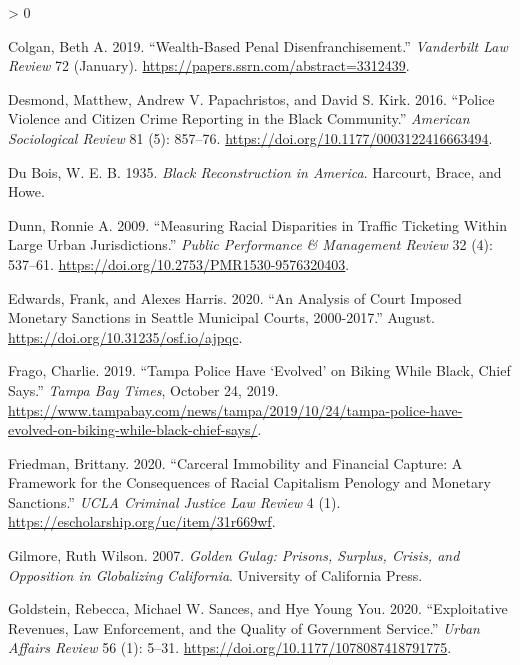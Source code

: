 \documentclass[
  12pt,
]{article}
\newlength{\cslhangindent}
\newenvironment{CSLReferences}[2] %
 {%
  \setlength{\parindent}{0pt}
  \ifodd #1 \everypar{\setlength{\hangindent}{\cslhangindent}}\ignorespaces\fi
  \ifnum #2 > 0
  \setlength{\parskip}{#2\baselineskip}
  \fi
 }%
 {}
\begin{document}
\begin{CSLReferences}{1}{0}
\leavevmode\hypertarget{ref-Colgan2019}{}%
Colgan, Beth A. 2019. {``Wealth-{Based Penal Disenfranchisement}.''} \emph{Vanderbilt Law Review} 72 (January). \url{https://papers.ssrn.com/abstract=3312439}.

\leavevmode\hypertarget{ref-Desmond2016}{}%
Desmond, Matthew, Andrew V. Papachristos, and David S. Kirk. 2016. {``Police {Violence} and {Citizen Crime Reporting} in the {Black Community}.''} \emph{American Sociological Review} 81 (5): 857--76. \url{https://doi.org/10.1177/0003122416663494}.

\leavevmode\hypertarget{ref-DuBois1935}{}%
Du Bois, W. E. B. 1935. \emph{Black {Reconstruction} in {America}}. {Harcourt, Brace, and Howe}.

\leavevmode\hypertarget{ref-Dunn2009}{}%
Dunn, Ronnie A. 2009. {``Measuring {Racial Disparities} in {Traffic Ticketing Within Large Urban Jurisdictions}.''} \emph{Public Performance \& Management Review} 32 (4): 537--61. \url{https://doi.org/10.2753/PMR1530-9576320403}.

\leavevmode\hypertarget{ref-Edwards2020}{}%
Edwards, Frank, and Alexes Harris. 2020. {``An {Analysis} of {Court Imposed Monetary Sanctions} in {Seattle Municipal Courts}, 2000-2017.''} August. \url{https://doi.org/10.31235/osf.io/ajpqc}.

\leavevmode\hypertarget{ref-Frago2019}{}%
Frago, Charlie. 2019. {``Tampa Police Have {`Evolved'} on Biking While Black, Chief Says.''} \emph{Tampa Bay Times}, October 24, 2019. \url{https://www.tampabay.com/news/tampa/2019/10/24/tampa-police-have-evolved-on-biking-while-black-chief-says/}.

\leavevmode\hypertarget{ref-Friedman2020}{}%
Friedman, Brittany. 2020. {``Carceral {Immobility} and {Financial Capture}: {A Framework} for the {Consequences} of {Racial Capitalism Penology} and {Monetary Sanctions}.''} \emph{UCLA Criminal Justice Law Review} 4 (1). \url{https://escholarship.org/uc/item/31r669wf}.

\leavevmode\hypertarget{ref-Gilmore2007}{}%
Gilmore, Ruth Wilson. 2007. \emph{Golden {Gulag}: {Prisons}, {Surplus}, {Crisis}, and {Opposition} in {Globalizing California}}. {University of California Press}.

\leavevmode\hypertarget{ref-Goldstein2020}{}%
Goldstein, Rebecca, Michael W. Sances, and Hye Young You. 2020. {``Exploitative {Revenues}, {Law Enforcement}, and the {Quality} of {Government Service}.''} \emph{Urban Affairs Review} 56 (1): 5--31. \url{https://doi.org/10.1177/1078087418791775}.


\end{CSLReferences}
\end{document}
